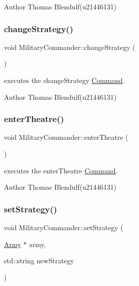 \begin{DoxyAuthor}{Author}
Thomas Blendulf(u21446131) 
\end{DoxyAuthor}
\mbox{\label{class_military_commander_a13eca5a78f356e36533cade003264a3c}} 
\subsubsection{\texorpdfstring{changeStrategy()}{changeStrategy()}}
{\footnotesize\ttfamily void Military\+Commander\+::change\+Strategy (\begin{DoxyParamCaption}{ }\end{DoxyParamCaption})}



executes the change\+Strategy \mbox{\hyperlink{class_command}{Command}}. 

\begin{DoxyAuthor}{Author}
Thomas Blendulf(u21446131) 
\end{DoxyAuthor}
\mbox{\label{class_military_commander_a1a1a7520c843505e6111f78c291983f6}} 
\subsubsection{\texorpdfstring{enterTheatre()}{enterTheatre()}}
{\footnotesize\ttfamily void Military\+Commander\+::enter\+Theatre (\begin{DoxyParamCaption}{ }\end{DoxyParamCaption})}



executes the enter\+Theatre \mbox{\hyperlink{class_command}{Command}}. 

\begin{DoxyAuthor}{Author}
Thomas Blendulf(u21446131) 
\end{DoxyAuthor}
\mbox{\label{class_military_commander_ade59c82b3b5b429e7d0d53a352c03ec6}} 
\subsubsection{\texorpdfstring{setStrategy()}{setStrategy()}}
{\footnotesize\ttfamily void Military\+Commander\+::set\+Strategy (\begin{DoxyParamCaption}\item[{\mbox{\hyperlink{class_army}{Army}} $\ast$}]{army,  }\item[{std\+::string}]{new\+Strategy }\end{DoxyParamCaption})}



